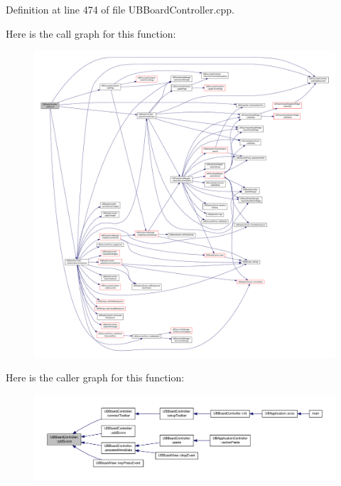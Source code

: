 Definition at line 474 of file U\-B\-Board\-Controller.\-cpp.



Here is the call graph for this function\-:
\nopagebreak
\begin{figure}[H]
\begin{center}
\leavevmode
\includegraphics[width=350pt]{d7/d62/class_u_b_board_controller_aae6e6e83f5207333812d4021dc7f535e_cgraph}
\end{center}
\end{figure}




Here is the caller graph for this function\-:
\nopagebreak
\begin{figure}[H]
\begin{center}
\leavevmode
\includegraphics[width=350pt]{d7/d62/class_u_b_board_controller_aae6e6e83f5207333812d4021dc7f535e_icgraph}
\end{center}
\end{figure}


